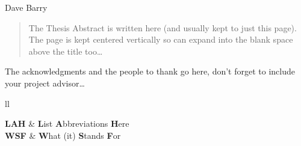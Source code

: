 \documentclass[
]{MastersDoctoralThesis} %
\begin{document}
\hfill Dave Barry


\begin{abstract}
\addchaptertocentry{\abstractname} %
The Thesis Abstract is written here (and usually kept to just this page). The page is kept centered vertically so can expand into the blank space above the title too\ldots
\end{abstract}


\begin{acknowledgements}
\addchaptertocentry{\acknowledgementname} %
The acknowledgments and the people to thank go here, don't forget to include your project advisor\ldots
\end{acknowledgements}


\tableofcontents %

\listoffigures %

\listoftables %


\begin{abbreviations}{ll} %

\textbf{LAH} & \textbf{L}ist \textbf{A}bbreviations \textbf{H}ere\\
\textbf{WSF} & \textbf{W}hat (it) \textbf{S}tands \textbf{F}or\\

\end{abbreviations}

\end{document}
